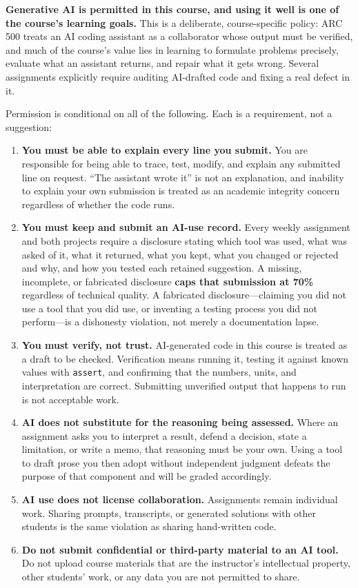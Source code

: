 \documentclass[11pt]{article}
\begin{document}
\textbf{Generative AI is permitted in this course, and using it well is one of the course's
learning goals.} This is a deliberate, course-specific policy: ARC 500 treats an AI coding
assistant as a collaborator whose output must be verified, and much of the course's value lies
in learning to formulate problems precisely, evaluate what an assistant returns, and repair
what it gets wrong. Several assignments explicitly require auditing AI-drafted code and fixing
a real defect in it.

Permission is conditional on all of the following. Each is a requirement, not a suggestion:

\begin{enumerate}
  \item \textbf{You must be able to explain every line you submit.} You are responsible for
        being able to trace, test, modify, and explain any submitted line on request. ``The
        assistant wrote it'' is not an explanation, and inability to explain your own
        submission is treated as an academic integrity concern regardless of whether the code
        runs.
  \item \textbf{You must keep and submit an AI-use record.} Every weekly assignment and both
        projects require a disclosure stating which tool was used, what was asked of it, what
        it returned, what you kept, what you changed or rejected and why, and how you tested
        each retained suggestion. A missing, incomplete, or fabricated disclosure
        \textbf{caps that submission at 70\%} regardless of technical quality. A fabricated
        disclosure---claiming you did not use a tool that you did use, or inventing a testing
        process you did not perform---is a dishonesty violation, not merely a
        documentation lapse.
  \item \textbf{You must verify, not trust.} AI-generated code in this course is treated as a
        draft to be checked. Verification means running it, testing it against known values
        with \texttt{assert}, and confirming that the numbers, units, and interpretation are
        correct. Submitting unverified output that happens to run is not acceptable work.
  \item \textbf{AI does not substitute for the reasoning being assessed.} Where an assignment
        asks you to interpret a result, defend a decision, state a limitation, or write a
        memo, that reasoning must be your own. Using a tool to draft prose you then adopt
        without independent judgment defeats the purpose of that component and will be graded
        accordingly.
  \item \textbf{AI use does not license collaboration.} Assignments remain individual work.
        Sharing prompts, transcripts, or generated solutions with other students is the same
        violation as sharing hand-written code.
  \item \textbf{Do not submit confidential or third-party material to an AI tool.} Do not
        upload course materials that are the instructor's intellectual property, other
        students' work, or any data you are not permitted to share.
\end{enumerate}
\end{document}
